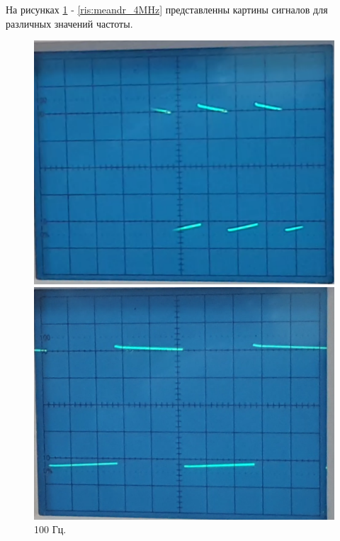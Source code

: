 \documentclass[12pt,a4paper]{article}
\begin{document}
	
	На рисунках \ref{ris:meandr_100Hz} - \ref{ris:meandr_4MHz} представленны картины сигналов для различных значений частоты.
	\begin{figure}[h!]
		\begin{center}
			\begin{minipage}[h]{0.32\linewidth}
				\includegraphics[width=1\linewidth]{meandr_100Hz}
				\caption{100 Гц.} %
				\label{ris:meandr_100Hz} %
			\end{minipage}
		\hfill
			\begin{minipage}[h]{0.32\linewidth}
				\includegraphics[width=1\linewidth]{meandr_200Hz}

\end{minipage}
\end{center}
\end{figure}
\end{document}
